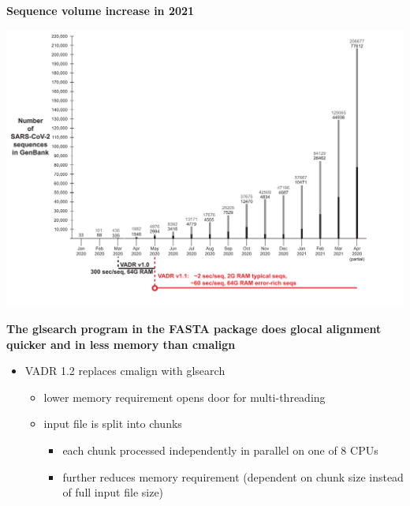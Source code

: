 \documentclass[landscape]{slides}
\begin{document}
\begin{slide}
\begin{center}
\Large{\textbf{Sequence volume increase in 2021}}

\includegraphics[width=10.5in]{figs/sars-counts-jan2020-apr2021-slide1}
\end{center}

\vfill
\end{slide}
\begin{slide}
\begin{center}
\textbf{The glsearch program in the FASTA package does glocal
  alignment quicker and in less memory than cmalign}
\end{center}

\begin{itemize}
\item VADR 1.2 replaces cmalign with glsearch
  \begin{itemize}
  \item lower memory requirement opens door for multi-threading
  \item input file is split into chunks
    \begin{itemize}
    \item each chunk processed independently in parallel on one of 8 CPUs
    \item further reduces memory requirement (dependent on chunk size
      instead of full input file size)
    \end{itemize}
  \end{itemize}
\end{itemize}
  
\vfill
\end{slide}
\end{document}
